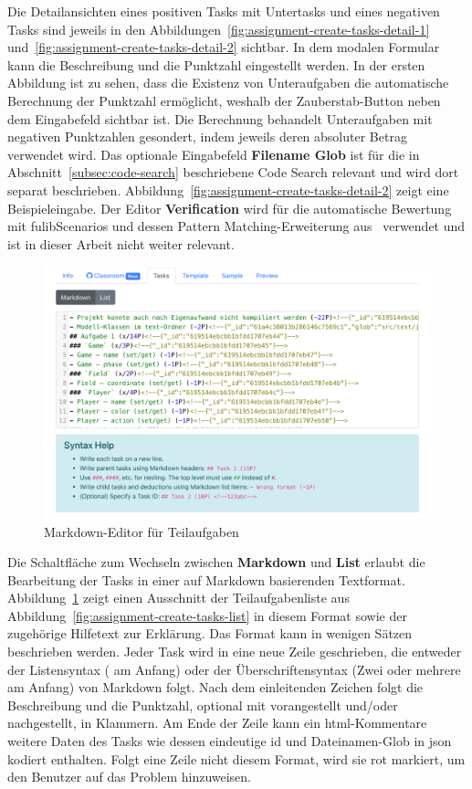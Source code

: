 Die Detailansichten eines positiven Tasks mit Untertasks und eines negativen Tasks sind jeweils in den Abbildungen~\ref{fig:assignment-create-tasks-detail-1} und~\ref{fig:assignment-create-tasks-detail-2} sichtbar.
In dem modalen Formular kann die Beschreibung und die Punktzahl eingestellt werden.
In der ersten Abbildung ist zu sehen, dass die Existenz von Unteraufgaben die automatische Berechnung der Punktzahl ermöglicht, weshalb der Zauberstab-Button neben dem Eingabefeld sichtbar ist.
Die Berechnung behandelt Unteraufgaben mit negativen Punktzahlen gesondert, indem jeweils deren absoluter Betrag verwendet wird.
Das optionale Eingabefeld \textbf{Filename Glob} ist für die in Abschnitt~\ref{subsec:code-search} beschriebene Code Search relevant und wird dort separat beschrieben.
Abbildung~\ref{fig:assignment-create-tasks-detail-2} zeigt eine Beispieleingabe.
Der Editor \textbf{Verification} wird für die automatische Bewertung mit fulibScenarios und dessen Pattern Matching-Erweiterung aus~\cite{bachelor-thesis} verwendet und ist in dieser Arbeit nicht weiter relevant.

\begin{figure}
    \centering
    \includegraphics[width=\textwidth]{images/assignment-create-tasks-markdown}
    \caption{Markdown-Editor für Teilaufgaben}
    \label{fig:assignment-create-tasks-markdown}
\end{figure}

Die Schaltfläche zum Wechseln zwischen \textbf{Markdown} und \textbf{List} erlaubt die Bearbeitung der Tasks in einer auf Markdown basierenden Textformat.
Abbildung~\ref{fig:assignment-create-tasks-markdown} zeigt einen Ausschnitt der Teilaufgabenliste aus Abbildung~\ref{fig:assignment-create-tasks-list} in diesem Format sowie der zugehörige Hilfetext zur Erklärung.
Das Format kann in wenigen Sätzen beschrieben werden.
Jeder Task wird in eine neue Zeile geschrieben, die entweder der Listensyntax (\code{-} am Anfang) oder der Überschriftensyntax (Zwei oder mehrere \code{\#} am Anfang) von Markdown folgt.
Nach dem einleitenden Zeichen folgt die Beschreibung und die Punktzahl, optional mit  vorangestellt und/oder  nachgestellt, in Klammern.
Am Ende der Zeile kann ein \ac{html}-Kommentare weitere Daten des Tasks wie dessen eindeutige \ac{id} und Dateinamen-Glob in \ac{json} kodiert enthalten.
Folgt eine Zeile nicht diesem Format, wird sie rot markiert, um den Benutzer auf das Problem hinzuweisen.

